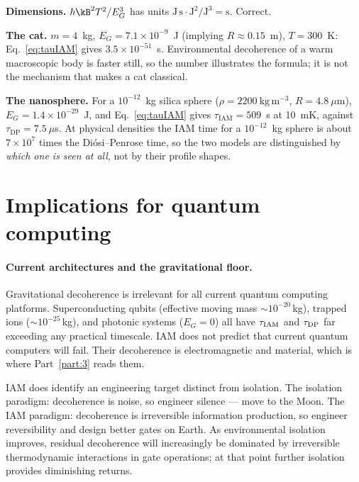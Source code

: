 \begin{checkbox}[title={Independent check: the numbers}]
\textbf{Dimensions.} $\hbar\kB^2T^2/E_G^3$ has units $\mathrm{J\,s}\cdot\mathrm{J}^2/\mathrm{J}^3=\mathrm s$.
Correct.

\textbf{The cat.} $m=4$~kg, $E_G=7.1\times10^{-9}$~J (implying $R\approx0.15$~m), $T=300$~K:
Eq.~\eqref{eq:tauIAM} gives $3.5\times10^{-51}$~s. \calc{} Environmental decoherence of a warm macroscopic body is faster still, so the number illustrates the formula; it is not the
mechanism that makes a cat classical.

\textbf{The nanosphere.} For a $10^{-12}$~kg silica sphere ($\rho=2200\ \mathrm{kg\,m^{-3}}$,
$R=4.8\ \mu$m), $E_G=1.4\times10^{-29}$~J, and Eq.~\eqref{eq:tauIAM} gives $\tau_{\mathrm{IAM}}=509$~s
at 10~mK, against $\tau_{\mathrm{DP}}=7.5\ \mu$s. \calc{} At physical densities the IAM time for a
$10^{-12}$~kg sphere is about $7\times10^{7}$ times the Di\'osi--Penrose time, so the two models are
distinguished by \emph{which one is seen at all}, not by their profile shapes.
\end{checkbox}

\section{Implications for quantum computing}\label{sec:gd_qc}
\paragraph{Current architectures and the gravitational floor.} Gravitational decoherence is irrelevant for all current quantum computing platforms.
Superconducting qubits (effective moving mass $\sim10^{-20}$\,kg), trapped ions ($\sim10^{-25}$\,kg), and photonic systems ($E_G=0$) all have $\tau_{\rm IAM}$
and $\tau_{\rm DP}$ far exceeding any practical timescale. \calc{} IAM does not predict that current quantum computers will fail. Their decoherence is
electromagnetic and material, which is where Part~\ref{part:3} reads them.

IAM does identify an engineering target distinct from isolation. The isolation paradigm: decoherence is noise, so engineer silence --- move to the Moon. The
IAM paradigm: decoherence is irreversible information production, so engineer reversibility and design better gates on Earth. As environmental isolation
improves, residual decoherence will increasingly be dominated by irreversible thermodynamic interactions in gate operations; at that point further
isolation provides diminishing returns. \interp

